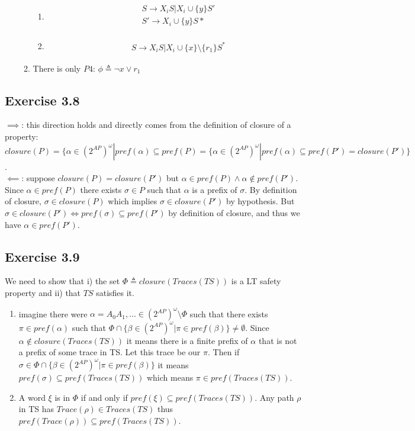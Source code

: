 \documentclass{article}
\begin{document}
\begin{enumerate}[label=\alph*)]
\begin{enumerate}[label=\roman*)]
\begin{enumerate}[label=P\arabic*), start = 2]
				\item \begin{align*}
					&S \rightarrow X_i S | X_i \cup \{y\} S'\\
					&S' \rightarrow X_i \cup \{y\} S* \\
				\end{align*}
				\item \begin{align*}
					&S \rightarrow X_i S | X_i \cup \{x\} \setminus \{r_1\} S^*
				\end{align*}
			\end{enumerate}
		\item There is only $P4$: $\phi \triangleq \lnot x \lor r_1$
		\end{enumerate}
	\end{enumerate}
	\subsection*{Exercise 3.8}
	$\implies$: this direction holds and directly comes from the definition of closure of a property: $closure(P) = \{\alpha \in (2^{AP})^\omega | pref(\alpha) \subseteq pref(P) = \{\alpha \in (2^{AP})^\omega | pref(\alpha) \subseteq pref(P') = closure(P')\}$.\\
	$\impliedby$: suppose $closure(P) = closure(P')$ but $\alpha \in pref(P) \land \alpha \notin pref(P')$. Since $\alpha \in pref(P)$ there exists $\sigma \in P$ such that $\alpha$ is a prefix of $\sigma$. By definition of closure, $\sigma \in closure(P)$ which implies $\sigma \in closure(P')$ by hypothesis. But $\sigma \in closure(P') \iff pref(\sigma) \subseteq pref(P')$ by definition of closure, and thus we have $\alpha \in pref(P')$.
	\subsection*{Exercise 3.9}
	We need to show that i) the set $\Phi \triangleq closure(Traces(TS))$ is a LT  safety property and ii) that $TS$ satisfies it. 
	\begin{enumerate}[label=\roman*)]
		\item imagine there were $\alpha = A_0A_1,... \in (2^{AP})^{\omega} \setminus \Phi$ such that there exists $\pi \in pref(\alpha)$ such that $\Phi \cap \{\beta \in (2^{AP})^{\omega} | \pi \in pref(\beta)\} \neq \emptyset$. 
		Since $\alpha \notin closure(Traces(TS))$ it means there is a finite prefix of $\alpha$ that is not a prefix of some trace in TS. Let this trace be our $\pi$.
		Then if $\sigma \in \Phi \cap \{\beta \in (2^{AP})^{\omega} | \pi \in pref(\beta)\}$ it means $pref(\sigma) \subseteq pref(Traces(TS))$ which means $\pi \in pref(Traces(TS))$.
		\item A word $\xi$ is in $\Phi$ if and only if $pref(\xi) \subseteq pref(Traces(TS))$. Any path $\rho$ in TS has $Trace(\rho) \in Traces(TS)$ thus $pref(Trace(\rho)) \subseteq pref(Traces(TS))$.  
	\end{enumerate}
\end{document}
